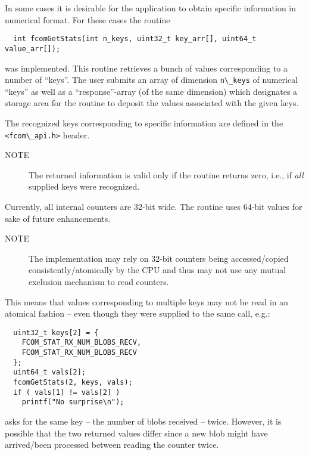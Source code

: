 \documentclass[11pt]{article}
\newcommand{\blob}{blob}
\newcommand{\cstl}[1]{{\lstinline+#1+}}
\newcommand{\note}[1]{
	\begin{description}
		\item[NOTE] #1
	\end{description}
}
\begin{document}
      In some cases it is desirable for the application to obtain
      specific information in numerical format. For these cases
      the routine
      \begin{verbatim}
  int fcomGetStats(int n_keys, uint32_t key_arr[], uint64_t value_arr[]);
      \end{verbatim}
      was implemented. This routine retrieves a bunch of values
      corresponding to a number of ``keys''. The user submits an
      array of dimension \cstl{n\_keys} of numerical ``keys''
      as well as a ``response''-array (of the same dimension) which
      designates a storage area for the routine to deposit the
      values associated with the given keys.

      The recognized keys corresponding to specific information
      are defined in the \cstl{<fcom\_api.h>} header.
 
      \note{The returned information is valid only if the
      routine returns zero, i.e., if {\em all} supplied keys
      were recognized.}

      Currently, all internal counters are 32-bit wide. The
      routine uses 64-bit values for sake of future enhancements.

      \note{The implementation may rely on 32-bit counters
      being accessed/copied consistently/atomically by the CPU and thus
      may not use any mutual exclusion mechanism to read counters.}

      This means that values corresponding to multiple keys
      may not be read in an atomical fashion -- even though
      they were supplied to the same call, e.g.:
      \begin{verbatim}
  uint32_t keys[2] = {
    FCOM_STAT_RX_NUM_BLOBS_RECV,
    FCOM_STAT_RX_NUM_BLOBS_RECV
  };
  uint64_t vals[2];
  fcomGetStats(2, keys, vals);
  if ( vals[1] != vals[2] )
    printf("No surprise\n");
      \end{verbatim}
      asks for the same key -- the number of \blob{}s received --
      twice. However, it is possible that the two returned values
      differ since a new \blob{} might have arrived/been processed
      between reading the counter twice.
\end{document}
